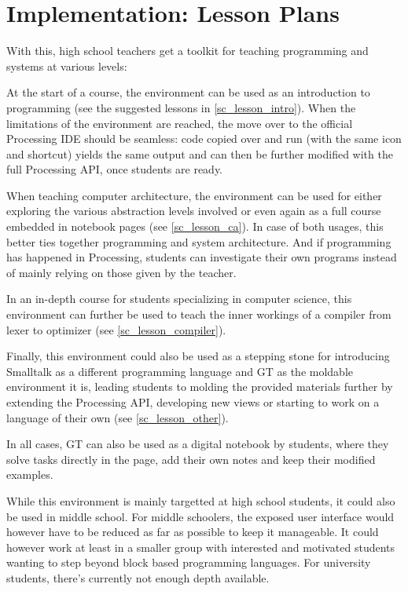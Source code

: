 
\chapter{Implementation: Lesson Plans} \label{ch_teaching}

With this, high school teachers get a toolkit for teaching programming and systems at various levels:

At the start of a course, the environment can be used as an introduction to programming (see the suggested lessons in \ref{sc_lesson_intro}). When the limitations of the environment are reached, the move over to the official Processing \ac{IDE} should be seamless: code copied over and run (with the same icon and shortcut) yields the same output and can then be further modified with the full Processing \ac{API}, once students are ready.

When teaching computer architecture, the environment can be used for either exploring the various abstraction levels involved or even again as a full course embedded in notebook pages (see \ref{sc_lesson_ca}). In case of both usages, this better ties together programming and system architecture. And if programming has happened in Processing, students can investigate their own programs instead of mainly relying on those given by the teacher.

In an in-depth course for students specializing in computer science, this environment can further be used to teach the inner workings of a compiler from lexer to optimizer (see \ref{sc_lesson_compiler}).

Finally, this environment could also be used as a stepping stone for introducing Smalltalk as a different programming language and \ac{GT} as the moldable environment it is, leading students to molding the provided materials further by \eg extending the Processing \ac{API}, developing new views or starting to work on a language of their own (see \ref{sc_lesson_other}).

In all cases, \ac{GT} can also be used as a digital notebook by students, where they solve tasks directly in the page, add their own notes and keep their modified examples.

While this environment is mainly targetted at high school students, it could also be used in middle school. For middle schoolers, the exposed user interface would however have to be reduced as far as possible to keep it manageable. It could however work at least in a smaller group with interested and motivated students wanting to step beyond block based programming languages. For university students, there's currently not enough depth available.




